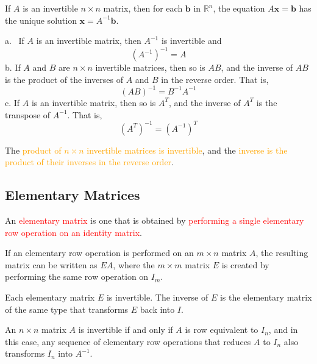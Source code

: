 \documentclass[12pt,a4paper]{article}
\renewcommand{\vec}[1]{\boldsymbol{#1}}
\begin{document}
\begin{tcolorbox}[colback=green!5,colframe=green!40!black,title= Theorem]
If $A$ is an invertible $n\times n$ matrix, then for each $\vec{b}$ in $\mathbb R^n$, the equation $A\vec{x} = \vec{b}$ has the unique solution $\vec{x} = A^{-1} \vec{b}$.
\end{tcolorbox}


\begin{tcolorbox}[colback=green!5,colframe=green!40!black,title= Theorem]
a. ~If $A$ is an invertible matrix, then $A^{-1}$ is invertible and 
\begin{equation*}
(A^{-1})^{-1} = A
\end{equation*}
b. If $A$ and $B$ are $n\times n$ invertible matrices, then so is $AB$, and the inverse of $AB$ is the product of the inverses of $A$ and $B$ in the reverse order. That is,
\begin{equation*}
(AB)^{-1} = B^{-1} A^{-1}
\end{equation*}
c. If $A$ is an invertible matrix, then so is $A^T$, and the inverse of $A^T$ is the transpose of $A^{-1}$. That is,
\begin{equation*}
(A^T )^{-1} = (A^{-1})^T
\end{equation*}
\end{tcolorbox}

The \textcolor{orange}{product of $n\times n$ invertible matrices is invertible}, and the \textcolor{orange}{inverse is the product of their inverses in the reverse order}.



\subsection{Elementary Matrices}
An \textcolor{red}{elementary matrix} is one that is obtained by \textcolor{red}{performing a single elementary row operation on an identity matrix}.


If an elementary row operation is performed on an $m\times n$ matrix $A$, the resulting matrix can be written as $EA$, where the $m\times m$ matrix $E$ is created by performing the same row operation on $I_m$.



Each elementary matrix $E$ is invertible. The inverse of $E$ is the elementary matrix of the same type that transforms $E$ back into $I$.


\begin{tcolorbox}[colback=green!5,colframe=green!40!black,title= Theorem]
An $n\times n$ matrix $A$ is invertible if and only if $A$ is row equivalent to $I_n$, and in this case, any sequence of elementary row operations that reduces $A$ to $I_n$ also transforms $I_n$ into $A^{-1}$.
\end{tcolorbox}
\end{document}
